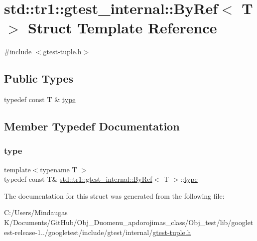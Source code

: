 \hypertarget{structstd_1_1tr1_1_1gtest__internal_1_1_by_ref}{}\section{std\+::tr1\+::gtest\+\_\+internal\+::By\+Ref$<$ T $>$ Struct Template Reference}
\label{structstd_1_1tr1_1_1gtest__internal_1_1_by_ref}


{\ttfamily \#include $<$gtest-\/tuple.\+h$>$}

\subsection*{Public Types}
\begin{DoxyCompactItemize}
\item 
typedef const T \& \mbox{\hyperlink{structstd_1_1tr1_1_1gtest__internal_1_1_by_ref_ac42ad942ee1cfa86b2abcce9b88ac10e}{type}}
\end{DoxyCompactItemize}


\subsection{Member Typedef Documentation}
\mbox{\label{structstd_1_1tr1_1_1gtest__internal_1_1_by_ref_ac42ad942ee1cfa86b2abcce9b88ac10e}} 
\subsubsection{\texorpdfstring{type}{type}}
{\footnotesize\ttfamily template$<$typename T $>$ \\
typedef const T\& \mbox{\hyperlink{structstd_1_1tr1_1_1gtest__internal_1_1_by_ref}{std\+::tr1\+::gtest\+\_\+internal\+::\+By\+Ref}}$<$ T $>$\+::\mbox{\hyperlink{structstd_1_1tr1_1_1gtest__internal_1_1_by_ref_ac42ad942ee1cfa86b2abcce9b88ac10e}{type}}}



The documentation for this struct was generated from the following file\+:\begin{DoxyCompactItemize}
\item 
C\+:/\+Users/\+Mindaugas K/\+Documents/\+Git\+Hub/\+Obj\+\_\+\+Duomenu\+\_\+apdorojimas\+\_\+class/\+Obj\+\_\+test/lib/googletest-\/release-\/1../googletest/include/gtest/internal/\mbox{\hyperlink{gtest-tuple_8h}{gtest-\/tuple.\+h}}\end{DoxyCompactItemize}
